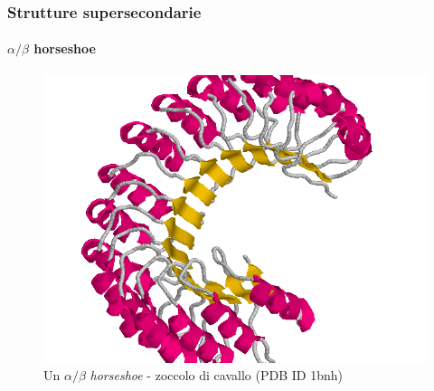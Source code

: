 \documentclass{beamer}
\begin{document}
\begin{frame}
\frametitle{Strutture supersecondarie}
  \framesubtitle{$\alpha/\beta$ horseshoe}
\begin{figure}
\centering
\includegraphics[scale=0.3]{horseshoe.png}\caption{Un $\alpha/\beta$ \emph{horseshoe} - zoccolo di cavallo (PDB ID 1bnh)\citep{PDB}}\label{bbarrel}
\end{figure} 
\end{frame}
\end{document}
